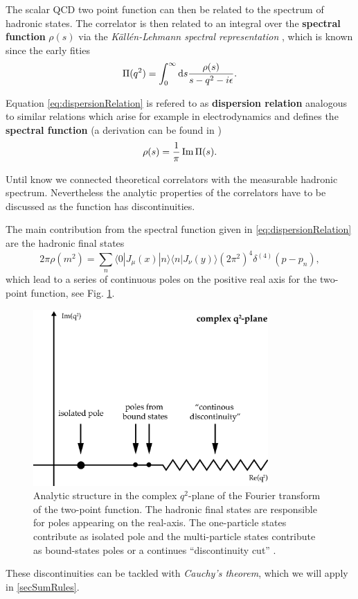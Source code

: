 \documentclass[../../index.tex]{subfiles}
\begin{document}
The scalar QCD two point function can then be related to the spectrum of
hadronic states. The correlator is then related to an integral over the
\textbf{spectral function} $\rho(s)$ via the \textit{Källén-Lehmann spectral
  representation} \cite{Kallen1952,Lehmann1954}, which is known since the early fities
\begin{equation}
  \label{eq:dispersionRelation}
  \Pi(q^2) = \int_0^\infty \dif s \frac{\rho(s)}{s - q^2 - i \epsilon}.
\end{equation}

Equation \ref{eq:dispersionRelation} is refered to as \textbf{dispersion relation} analogous to similar
relations which arise for example in electrodynamics and defines the
\textbf{spectral function} (a derivation can be found in \cite{Rafael1997})
\begin{equation}
  \label{eq:spectralFunction}
  \rho(s) = \frac{1}{\pi} \operatorname{Im} \Pi(s).
\end{equation}

Until know we connected theoretical correlators with the measurable hadronic
spectrum. Nevertheless the analytic properties of the correlators have to be
discussed as the function has discontinuities.

The main contribution from the spectral function given in
\cref{eq:dispersionRelation} are the hadronic final states
\begin{equation}
  2 \pi \rho(m^2) = \sum_n \langle  0 | J_\mu(x) | n \rangle \langle n | J_\nu(y) \rangle (2 \pi^2)^4 \delta^{(4)}(p - p_n),
\end{equation}
which lead to a series of continuous poles on the positive real axis for the
two-point function, see Fig. \ref{fig:analyticStructureCorrelator}.
\begin{figure}[h]
  \centering
  \includegraphics[width=0.8\textwidth]{./images/analyticStructureCorrelator.eps}
  \caption{Analytic structure in the complex $q^2$-plane of the Fourier
    transform of the two-point function. The hadronic final states are
    responsible for poles appearing on the real-axis. The one-particle states contribute as
    isolated pole and the multi-particle states contribute as bound-states poles
    or a continues ``discontinuity cut'' \cite{Peskin1995}.}
  \label{fig:analyticStructureCorrelator}
\end{figure}
These discontinuities can be tackled with \textit{Cauchy's theorem}, which we
will apply in \cref{secSumRules}.
\end{document}

